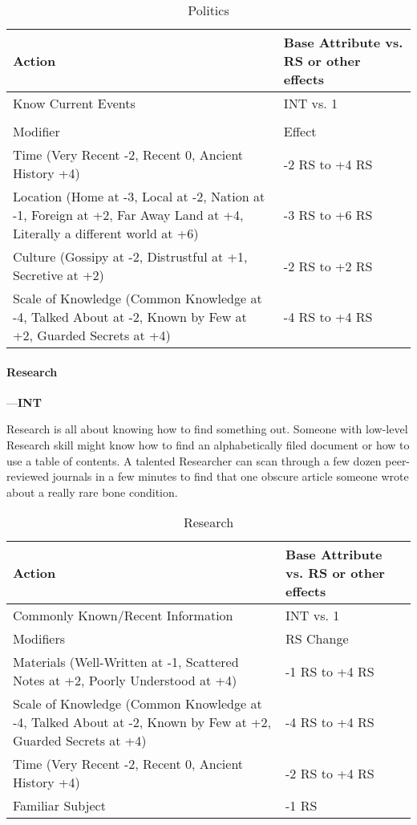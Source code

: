 \documentclass[oneside,11pt,english]{book}
\begin{document}
\begin{longtabu} to \linewidth{X[1.5]X[r]}
	\caption{Politics}
	\label{tab:Politics}\\
	\rowfont[c]{}Action &Base Attribute vs. RS or other effects\\\toprule
Know Current Events &INT vs. 1\\
	\\
		\rowfont[c]{} Modifier & Effect\\\cmidrule(lr){1-2} 
Time (Very Recent -2, Recent 0, Ancient History +4) &-2 RS to +4 RS\\
Location (Home at -3, Local at -2, Nation at -1, Foreign at +2, Far Away Land at +4, Literally a different world at +6) &-3 RS to +6 RS\\
Culture (Gossipy at -2, Distrustful at +1, Secretive at +2) &-2 RS to +2 RS\\
Scale of Knowledge (Common Knowledge at -4, Talked About at -2, Known by Few at +2, Guarded Secrets at +4) &-4 RS to +4 RS\\
\end{longtabu}
\paragraph{\label{skill:Research}Research}---\quad\textbf{INT}\par
Research is all about knowing how to find something out. Someone with low-level Research skill might know how to find an alphabetically filed document or how to use a table of contents. A talented Researcher can scan through a few dozen peer-reviewed journals in a few minutes to find that one obscure article someone wrote about a really rare bone condition.

\begin{longtabu} to \linewidth{X[1.5]X[r]}
	\caption{Research}
	\label{tab:Research}\\
	\rowfont[c]{}Action &Base Attribute vs. RS or other effects\\\toprule
Commonly Known/Recent Information&INT vs. 1
	\\
		\rowfont[c]{}Modifiers&RS Change\\\cmidrule(lr){1-2}
Materials (Well-Written at -1, Scattered Notes at +2, Poorly Understood at +4)&-1 RS to +4 RS\\
Scale of Knowledge (Common Knowledge at -4, Talked About at -2, Known by Few at +2, Guarded Secrets at +4)&-4 RS to +4 RS\\
Time (Very Recent -2, Recent 0, Ancient History +4)&-2 RS to +4 RS\\
Familiar Subject&-1 RS\\
\end{longtabu}
\end{document}
